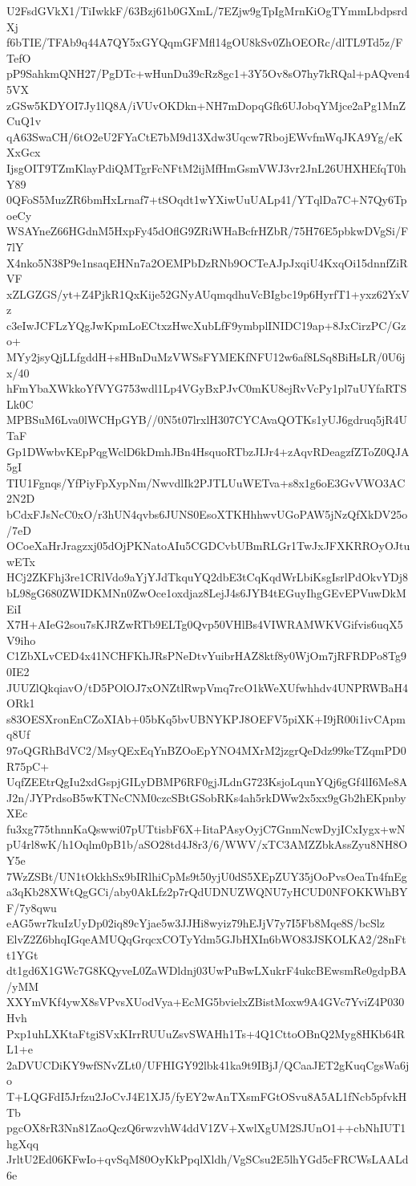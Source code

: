 U2FsdGVkX1/TiIwkkF/63Bzj61b0GXmL/7EZjw9gTpIgMrnKiOgTYmmLbdpsrdXj
f6bTIE/TFAb9q44A7QY5xGYQqmGFMfl14gOU8kSv0ZhOEORc/dlTL9Td5z/FTefO
pP9SahkmQNH27/PgDTc+wHunDu39cRz8gc1+3Y5Ov8sO7hy7kRQal+pAQven45VX
zGSw5KDYOI7Jy1lQ8A/iVUvOKDkn+NH7mDopqGfk6UJobqYMjce2aPg1MnZCuQ1v
qA63SwaCH/6tO2eU2FYaCtE7bM9d13Xdw3Uqcw7RbojEWvfmWqJKA9Yg/eKXxGcx
IjsgOIT9TZmKlayPdiQMTgrFcNFtM2ijMfHmGsmVWJ3vr2JnL26UHXHEfqT0hY89
0QFoS5MuzZR6bmHxLrnaf7+tSOqdt1wYXiwUuUALp41/YTqlDa7C+N7Qy6TpoeCy
WSAYneZ66HGdnM5HxpFy45dOflG9ZRiWHaBcfrHZbR/75H76E5pbkwDVgSi/F7lY
X4nko5N38P9e1nsaqEHNn7a2OEMPbDzRNb9OCTeAJpJxqiU4KxqOi15dnnfZiRVF
xZLGZGS/yt+Z4PjkR1QxKije52GNyAUqmqdhuVcBIgbc19p6HyrfT1+yxz62YxVz
c3eIwJCFLzYQgJwKpmLoECtxzHwcXubLfF9ymbplINIDC19ap+8JxCirzPC/Gzo+
MYy2jsyQjLLfgddH+sHBnDuMzVWSsFYMEKfNFU12w6af8LSq8BiHsLR/0U6jx/40
hFmYbaXWkkoYfVYG753wdl1Lp4VGyBxPJvC0mKU8ejRvVcPy1pl7uUYfaRTSLk0C
MPBSuM6Lva0lWCHpGYB//0N5t07lrxlH307CYCAvaQOTKs1yUJ6gdruq5jR4UTaF
Gp1DWwbvKEpPqgWclD6kDmhJBn4HsquoRTbzJIJr4+zAqvRDeagzfZToZ0QJA5gI
TIU1Fgnqs/YfPiyFpXypNm/NwvdlIk2PJTLUuWETva+s8x1g6oE3GvVWO3AC2N2D
bCdxFJsNcC0xO/r3hUN4qvbs6JUNS0EsoXTKHhhwvUGoPAW5jNzQfXkDV25o/7eD
OCoeXaHrJragzxj05dOjPKNatoAIu5CGDCvbUBmRLGr1TwJxJFXKRROyOJtuwETx
HCj2ZKFhj3re1CRlVdo9aYjYJdTkquYQ2dbE3tCqKqdWrLbiKsgIsrlPdOkvYDj8
bL98gG680ZWIDKMNn0ZwOce1oxdjaz8LejJ4s6JYB4tEGuyIhgGEvEPVuwDkMEiI
X7H+AIeG2sou7sKJRZwRTb9ELTg0Qvp50VHlBs4VIWRAMWKVGifvis6uqX5V9iho
C1ZbXLvCED4x41NCHFKhJRsPNeDtvYuibrHAZ8ktf8y0WjOm7jRFRDPo8Tg90IE2
JUUZlQkqiavO/tD5POlOJ7xONZtlRwpVmq7rcO1kWeXUfwhhdv4UNPRWBaH4ORk1
s83OESXronEnCZoXIAb+05bKq5bvUBNYKPJ8OEFV5piXK+I9jR00i1ivCApmq8Uf
97oQGRhBdVC2/MsyQExEqYnBZOoEpYNO4MXrM2jzgrQeDdz99keTZqmPD0R75pC+
UqfZEEtrQgIu2xdGspjGILyDBMP6RF0gjJLdnG723KsjoLqunYQj6gGf4lI6Me8A
J2n/JYPrdsoB5wKTNcCNM0czcSBtGSobRKs4ah5rkDWw2x5xx9gGb2hEKpnbyXEc
fu3xg775thnnKaQswwi07pUTtisbF6X+IitaPAsyOyjC7GnmNcwDyjICxIygx+wN
pU4rl8wK/h1Oqlm0pB1b/aSO28td4J8r3/6/WWV/xTC3AMZZbkAssZyu8NH8OY5e
7WzZSBt/UN1tOkkhSx9bIRlhiCpMs9t50yjU0dS5XEpZUY35jOoPvsOeaTn4fnEg
a3qKb28XWtQgGCi/aby0AkLfz2p7rQdUDNUZWQNU7yHCUD0NFOKKWhBYF/7y8qwu
eAG5wr7kuIzUyDp02iq89cYjae5w3JJHi8wyiz79hEJjV7y7I5Fb8Mqe8S/bcSlz
ElvZ2Z6bhqIGqeAMUQqGrqcxCOTyYdm5GJbHXIn6bWO83JSKOLKA2/28nFtt1YGt
dt1gd6X1GWc7G8KQyveL0ZaWDldnj03UwPuBwLXukrF4ukcBEwsmRe0gdpBA/yMM
XXYmVKf4ywX8sVPvsXUodVya+EcMG5bvielxZBistMoxw9A4GVc7YviZ4P030Hvh
Pxp1uhLXKtaFtgiSVxKIrrRUUuZsvSWAHh1Ts+4Q1CttoOBnQ2Myg8HKb64RL1+e
2aDVUCDiKY9wfSNvZLt0/UFHIGY92lbk41ka9t9IBjJ/QCaaJET2gKuqCgsWa6jo
T+LQGFdI5Jrfzu2JoCvJ4E1XJ5/fyEY2wAnTXsmFGtOSvu8A5AL1fNcb5pfvkHTb
pgcOX8rR3Nn81ZaoQczQ6rwzvhW4ddV1ZV+XwlXgUM2SJUnO1++cbNhIUT1hgXqq
JrltU2Ed06KFwIo+qvSqM80OyKkPpqlXldh/VgSCsu2E5lhYGd5cFRCWsLAALd6e
